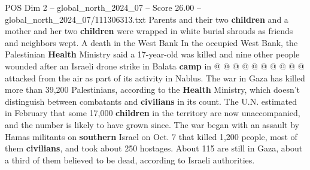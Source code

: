 \begin{textsample}{POS Dim 2 – global\_north\_2024\_07 – Score 26.00 – global\_north\_2024\_07/111306313.txt}
Parents and their two \textbf{children} and a mother and her two \textbf{children} were wrapped in white burial shrouds as friends and neighbors wept.
A death in the West Bank In the occupied West Bank, the Palestinian \textbf{Health} Ministry said a 17-year-old was killed and nine other people wounded after an Israeli drone strike in Balata \textbf{camp} in @ @ @ @ @ @ @ @ @ @ attacked from the air as part of its activity in Nablus.
The war in Gaza has killed more than 39,200 Palestinians, according to the \textbf{Health} Ministry, which doesn't distinguish between combatants and \textbf{civilians} in its count.
The U.N. estimated in February that some 17,000 \textbf{children} in the territory are now unaccompanied, and the number is likely to have grown since.
The war began with an assault by Hamas militants on \textbf{southern} Israel on Oct. 7 that killed 1,200 people, most of them \textbf{civilians}, and took about 250 hostages.
About 115 are still in Gaza, about a third of them believed to be dead, according to Israeli authorities.

\end{textsample}
